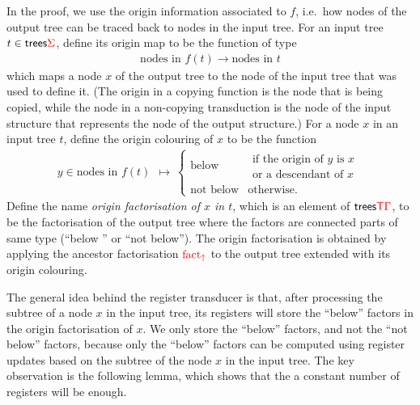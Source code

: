 \newcommand{\origin}[1]{\mathrm{origin}_{#1}}
\newcommand{\orcol}[2]{\mathrm{orcol}_{#1}^{#2}}
In the proof, we use the origin information associated to $f$, i.e.~how nodes of the output tree can be traced back to nodes in the input tree. For an input tree $t \in \mathsf {trees} {\color{red}{\Sigma}}$, define its origin map
to be the function of type
\begin{align*}
    \text{nodes in $f(t)$} \to \text{nodes in $t$}
   \end{align*}
which maps a node $x$ of the output tree to the node of the input tree that was used to define it. (The origin in a copying function is the node that is being copied, while the node in a non-copying transduction is the node of the input structure that represents the node of the output structure.) For a node $x$ in an input tree $t$, define the origin colouring of $x$ to be the function 
\begin{align*}
 y \in \text{nodes in $f(t)$} \ \ \mapsto \  \begin{cases}
    \text{below} & \begin{array}{l}
    \text{if the origin of $y$ is $x$}\\ \text{or a descendant of $x$}
\end{array}     \\
    \text{not below} & \text{otherwise.}
\end{cases}
\end{align*}
Define  the name \emph{origin factorisation of $x$ in $t$}, which is an element of $\mathsf {trees} {\color{red}{\mathsf T}} {\color{red}{\Gamma}}$, to be the factorisation of  the output tree where the factors are connected parts of same type (``below '' or ``not below''). The origin factorisation is obtained by applying the ancestor factorisation ${\color{red}{\mathrm{fact_{\uparrow}}}}$ to the output tree extended with its  origin colouring. 

The general idea behind the register transducer is that, after processing the subtree of a node $x$ in the input tree, its registers will store the ``below'' factors in the origin factorisation of $x$. We only store the ``below'' factors, and not the ``not below'' factors, because only the ``below'' factors can be computed using register updates based on the subtree of the node $x$ in the input tree. The key observation is the following lemma, which shows that the a constant number of registers will be enough. 




